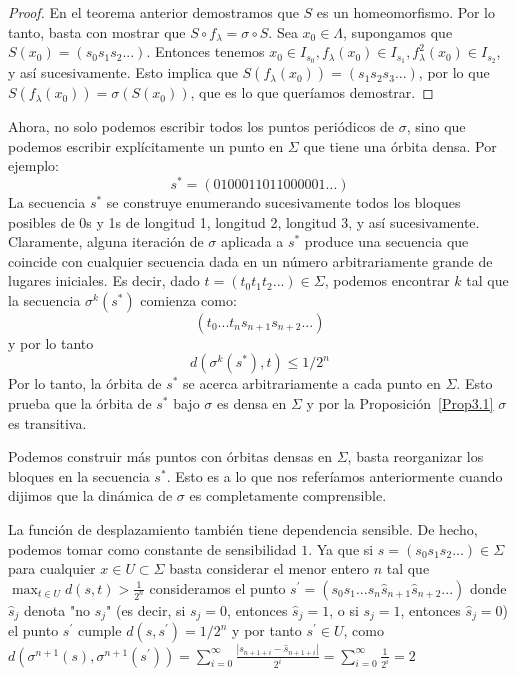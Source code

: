 \documentclass[12pt,a4paper]{report}
\theoremstyle{definition}
\begin{document}
\begin{proof}

En el teorema anterior demostramos que \(S\) es un homeomorfismo. Por lo tanto, basta con mostrar que \(S\circ f_{\lambda}=\sigma\circ S\). Sea \(x_{0}\in\Lambda\), supongamos que \(S(x_{0})=(s_{0}s_{1}s_{2}...)\). Entonces tenemos \(x_{0}\in I_{s_{0}}, f_{\lambda}(x_{0})\in I_{s_{1}}, f_{\lambda}^{2}(x_{0})\in I_{s_{2}}\), y así sucesivamente. Esto implica que \(S(f_{\lambda}(x_{0}))=(s_{1}s_{2}s_{3}...)\), por lo que \(S(f_{\lambda}(x_{0}))=\sigma(S(x_{0}))\), que es lo que queríamos demostrar.

\end{proof}

Ahora, no solo podemos escribir todos los puntos periódicos de \(\sigma\), sino que podemos escribir explícitamente un punto en \(\Sigma\) que tiene una órbita densa. Por ejemplo:
\[
s^{*}=(0100011011000001...)
\]
%
La secuencia \(s^{*}\) se construye enumerando sucesivamente todos los bloques posibles de 0s y 1s de longitud 1, longitud 2, longitud 3, y así sucesivamente. Claramente, alguna iteración de \(\sigma\) aplicada a \(s^{*}\) produce una secuencia que coincide con cualquier secuencia dada en un número arbitrariamente grande de lugares iniciales. Es decir, dado \(t=(t_{0}t_{1}t_{2}...)\in\Sigma\), podemos encontrar \(k\) tal que la secuencia \(\sigma^{k}(s^{*})\) comienza como:
\[
(t_{0}...t_{n}s_{n+1}s_{n+2}...)
\]
%
y por lo tanto
\[
d(\sigma^{k}(s^{*}),t)\le1/2^{n}
\]
%
Por lo tanto, la órbita de \(s^{*}\) se acerca arbitrariamente a cada punto en \(\Sigma\). Esto prueba que la órbita de \(s^{*}\) bajo \(\sigma\) es densa en \(\Sigma\) y por la Proposición~\ref{Prop3.1} \(\sigma\) es transitiva.
 
Podemos construir más puntos con órbitas densas en \(\Sigma\), basta reorganizar los bloques en la secuencia \(s^{*}\). Esto es a lo que nos referíamos anteriormente cuando dijimos que la dinámica de \(\sigma\) es completamente comprensible.

La función de desplazamiento también tiene dependencia sensible. De hecho, podemos tomar como constante de sensibilidad $1$. Ya que si \(s=(s_{0}s_{1}s_{2}...)\in\Sigma\) para cualquier $x \in U \subset \Sigma$ basta considerar el menor entero $n$ tal que $\max_{t \in U} d(s,t) > \frac{1}{2^n}$ consideramos el punto $s^{\prime} =(s_{0}s_{1}...s_{n}\hat{s}_{n+1}\hat{s}_{n+2}...)$ donde
\(\hat{s}_{j}\) denota "no \(s_{j}\)" (es decir, si \(s_{j}=0\), entonces \(\hat{s}_{j}=1\), o si \(s_{j}=1\), entonces \(\hat{s}_{j}=0\)) el punto \(s^{\prime}\) cumple 
\(d(s,s^{\prime})=1/2^{n}\) y por tanto $s^{\prime} \in U$, como \(d(\sigma^{n+1}(s),\sigma^{n+1}(s^{\prime}))=  \sum_{i=0}^{\infty}\frac{|s_{n+1+i}-\hat{s}_{n+1+i}|}{2^i} = \sum_{i=0}^{\infty}\frac{1}{2^i} = 2\)
\end{document}

